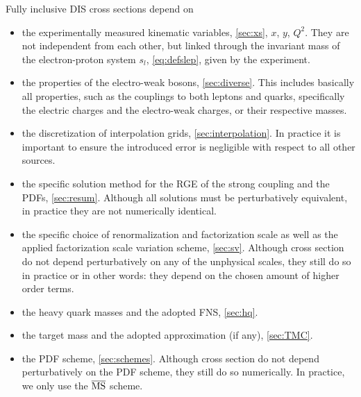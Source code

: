 Fully inclusive DIS cross sections depend on
\begin{itemize}
    \item the experimentally measured kinematic variables, \cref{sec:xs}, $x$, $y$, $Q^2$.
        They are not independent from each other, but linked through the invariant mass of the electron-proton system $s_l$, \cref{eq:defslep}, given by the experiment.
    \item the properties of the electro-weak bosons, \cref{sec:diverse}.
        This includes basically all properties, such as the couplings to both leptons and quarks, specifically the electric charges and the electro-weak charges, or their respective masses.
    \item the discretization of interpolation grids, \cref{sec:interpolation}.
        In practice it is important to ensure the introduced error is negligible with respect to all other sources.
    \item the specific solution method for the RGE of the strong coupling and the PDFs, \cref{sec:resum}.
        Although all solutions must be perturbatively equivalent, in practice they are not numerically identical.
    \item the specific choice of renormalization and factorization scale as well as the applied factorization scale variation scheme, \cref{sec:sv}.
        Although cross section do not depend perturbatively on any of the unphysical scales, they still do so in practice or in other words: they depend on the chosen amount of higher order terms.
    \item the heavy quark masses and the adopted FNS, \cref{sec:hq}.
    \item the target mass and the adopted approximation (if any), \cref{sec:TMC}.
    \item the PDF scheme, \cref{sec:schemes}.
        Although cross section do not depend perturbatively on the PDF scheme, they still do so numerically.
        In practice, we only use the $\overline{\mathrm{MS}}$ scheme.
\end{itemize}

